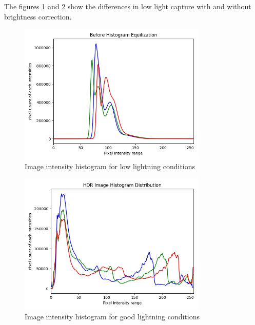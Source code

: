 The figures \ref{fig:histLow} and  \ref{fig:histHigh} show the differences in low light capture with and without brightness correction.
	\begin{figure}[h]
	\begin{center}
		\includegraphics[width=0.8\textwidth]{data/images/Before_Histogram_equilization.jpg}
		\caption{Image intensity histogram for low lightning conditions}
		\label{fig:histLow}
	\end{center}
	\vspace{-0.3in}
\end{figure} 

\begin{figure}[h]
	\begin{center}
		\includegraphics[width=0.8\textwidth]{data/images/Normal_Histogram_Distribution.jpeg}
		\caption{Image intensity histogram for good lightning conditions}
		\label{fig:histHigh}
	\end{center}
	\vspace{-0.3in}
\end{figure} 

